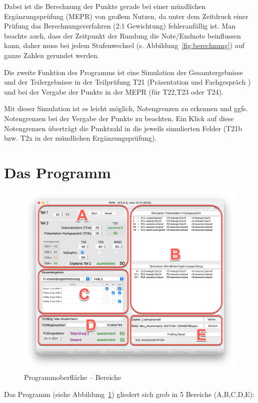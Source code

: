 \documentclass[a4paper,notitlepage,parskip=half]{scrartcl}
\begin{document}
Dabei ist die Berechnung der Punkte gerade bei einer mündlichen Ergänzungsprüfung (MEPR) von großem Nutzen, da unter dem Zeitdruck einer Prüfung  das Berechnungsverfahren (2:1 Gewichtung) fehleranfällig ist. Man beachte auch, dass der Zeitpunkt der Rundung die Note/Endnote beinflussen kann, daher muss bei jedem Stufenwechsel (s. Abbildung~\ref{fig:berechnung}) auf ganze Zahlen gerundet werden.

Die zweite Funktion des Programms ist eine Simulation der Gesamtergebnisse und der Teilergebnisse in der Teilprüfung T21 (Präsentation und Fachgespräch )  und bei der Vergabe der Punkte in der MEPR (für T22,T23 oder T24).

Mit dieser Simulation ist es leicht möglich, Notengrenzen zu erkennen und ggfs. Notengrenzen bei der Vergabe der Punkte zu beachten. Ein Klick auf diese Notengrenzen überträgt die Punktzahl in die jeweils simulierten Felder (T21b bzw. T2x in der mündlichen Ergänzungsprüfung).

\section{Das Programm}

\begin{figure}[ht]
	\centering
    \includegraphics[width=\textwidth]{HauptfensterAufteilung.png}
	\caption{Programmoberfläche -- Bereiche}
	\label{fig:pihk}
\end{figure}

Das Programm (siehe Abbildung~\ref{fig:pihk}) gliedert sich grob in 5 Bereiche (A,B,C,D,E):
\end{document}
